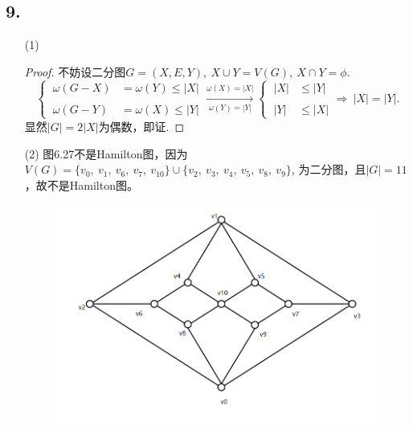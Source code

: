 \documentclass{article}
\begin{document}
\subsection*{9.}
\begin{enumerate}
    \item [(1)]
    \begin{proof}
        不妨设二分图$G=(X,E,Y),\ X\cup Y=V(G),\ X\cap Y=\phi$.
        \[
            \begin{cases}
                \ \omega (G-X) & = \omega (Y) \leq |X|\\
                \\
                \ \omega (G-Y) & = \omega (X) \leq |Y|
            \end{cases}
            \xrightarrow[\omega(Y)=|Y|]{\omega(X)=|X|}
            \begin{cases}
                \ |X| &\leq |Y|\\
                \\
                \ |Y| &\leq |X|
            \end{cases}
            \Rightarrow\ 
            |X|=|Y|.
        \]
        显然$|G|=2|X|$为偶数，即证.
    \end{proof}
    \item [(2)]图6.27不是Hamilton图，因为$V(G)=\{v_0,\ v_1,\ v_6,\ v_7,\ v_{10} \}\cup \{v_2,\ v_3,\ v_4,\ v_5,\ v_8,\ v_9 \}$,
    为二分图，且$|G|=11$，故不是Hamilton图。
    \begin{figure}[htbp]
        \centering
        \includegraphics[scale=0.6]{t9.png}
    \end{figure}
\end{enumerate}
\end{document}

